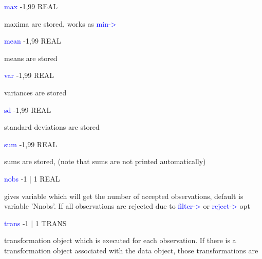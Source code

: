 \hline
\vspace{0.3cm}
\noindent \textcolor{blue}{max}  \tabto{3cm} -1,99 \tabto{5cm}  REAL \tabto{7cm}
\begin{changemargin}{3cm}{0cm}
\noindent  maxima are stored, works as \textcolor{blue}{min->}
\end{changemargin}
\vspace{0.3cm}
\hline
\vspace{0.3cm}
\noindent \textcolor{blue}{mean}  \tabto{3cm} -1,99 \tabto{5cm}  REAL  \tabto{7cm}
\begin{changemargin}{3cm}{0cm}
\noindent  means are stored
\end{changemargin}
\vspace{0.3cm}
\hline
\vspace{0.3cm}
\noindent \textcolor{blue}{var}  \tabto{3cm} -1,99 \tabto{5cm}  REAL \tabto{7cm}
\begin{changemargin}{3cm}{0cm}
\noindent  variances are stored
\end{changemargin}
\vspace{0.3cm}
\hline
\vspace{0.3cm}
\noindent \textcolor{blue}{sd}  \tabto{3cm} -1,99 \tabto{5cm}  REAL \tabto{7cm}
\begin{changemargin}{3cm}{0cm}
\noindent  standard deviations are stored
\end{changemargin}
\vspace{0.3cm}
\hline
\vspace{0.3cm}
\noindent \textcolor{blue}{sum}  \tabto{3cm} -1,99 \tabto{5cm}  REAL \tabto{7cm}
\begin{changemargin}{3cm}{0cm}
\noindent 	sums are stored, (note that sums are not printed automatically)
\end{changemargin}
\vspace{0.3cm}
\hline
\vspace{0.3cm}
\noindent \textcolor{blue}{nobs}  \tabto{3cm} -1 | 1 \tabto{5cm}  REAL \tabto{7cm}
\begin{changemargin}{3cm}{0cm}
\noindent 	gives variable which will get the number of accepted observations, default is variable 'Nnobs'. If all observations are rejected due to \textcolor{blue}{filter->} or \textcolor{blue}{reject->} opt
\end{changemargin}
\vspace{0.3cm}
\hline
\vspace{0.3cm}
\noindent \textcolor{blue}{trans}  \tabto{3cm} -1 | 1 \tabto{5cm}  TRANS \tabto{7cm}
\begin{changemargin}{3cm}{0cm}
\noindent 	transformation object which is executed for each observation. If there is a transformation object associated with the data object, those transformations are
\end{changemargin}
